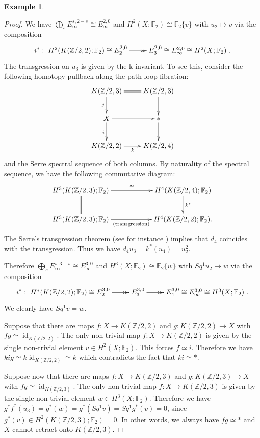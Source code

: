 \documentclass{amsart}
\theoremstyle{definition}
\newtheorem{exmp}[thm]{Example}
\theoremstyle{remark}
\DeclareMathOperator{\id}{id}
\newcommand{\Z}{\mathbb{Z}}
\newcommand{\F}{\mathbb{F}}
\begin{document}
\begin{exmp}
\begin{proof}
We have $\bigoplus_{s}E_\infty^{s,2-s}\cong E_\infty^{2,0}$ and $H^2(X;\F_2)\cong\F_2\{v\}$ with $u_2\mapsto v$ via the composition
$$
i^*:\xymatrix{H^2(K(\Z/2,2);\F_2)\cong E^{2,0}_2\ar@{->>}[r] &E^{2,0}_3\cong E^{2,0}_\infty\cong H^2(X;\F_2)}.
$$ 
\newpage
The transgression on $u_3$ is given by the k-invariant. To see this, consider the following homotopy pullback along the path-loop fibration:
$$\xymatrix{
K(\Z/2,3)\ar[d]_j\ar@{=}[r] &K(\Z/2,3)\ar[d]\\
X\ar[d]_i\ar[r] &{*}\ar[d]\\
K(\Z/2,2)\ar[r]_-k &K(\Z/2,4)
}$$ and the Serre spectral sequence of both columns. By naturality of the spectral sequence, we have the following commutative diagram:
$$\xymatrix@C=2truecm{
H^3(K(\Z/2,3);\F_2)\ar@{=}[d]\ar[r]^-\cong &H^4(K(\Z/2,4);\F_2)\ar[d]^{k^*}\\
H^3(K(\Z/2,3);\F_2)\ar[r]_-{\text{(transgression)}} &H^4(K(\Z/2,2);\F_2).
}$$ The Serre's transgression theorem (see for instance \cite[Theorem 6.8, p. 189]{Mc00}) implies that $d_4$ coincides with the transgression. Thus we have $d_4u_3=k^*(u_4)=u_2^2$. 

Therefore $\bigoplus_{s}E_\infty^{s,3-s}\cong E_\infty^{3,0}$ and $H^3(X;\F_2)\cong\F_2\{w\}$ with $Sq^1u_2\mapsto w$ via the composition
$$
i^*:\xymatrix{H^*(K(\Z/2,2);\F_2)\cong E_2^{3,0}\ar@{->>}[r] &E_3^{3,0}\ar@{->>}[r] &E_4^{3,0}\cong E_\infty^{3,0}\cong H^3(X;\F_2)}.
$$ 
We clearly have $Sq^1v=w$.

Suppose that there are maps $f:X\to K(\Z/2,2)$ and $g:K(\Z/2,2)\to X$ with $fg\simeq \id_{K(\Z/2,2)}$. The only non-trivial map $f:X\to K(\Z/2,2)$ is given by the single non-trivial element $v\in H^2(X;\F_2)$. This forces $f\simeq i$. Therefore we have $kig\simeq k\id_{K(\Z/2,2)}\simeq k$ which contradicts the fact that $ki\simeq *$.

Suppose now that there are maps $f:X\to K(\Z/2,3)$ and $g:K(\Z/2,3)\to X$ with $fg\simeq \id_{K(\Z/2,3)}$. The only non-trivial map $f:X\to K(\Z/2,3)$ is given by the single non-trivial element $w\in H^3(X;\F_2)$. Therefore we have $g^*f^*(u_3)=g^*(w)=g^*(Sq^1v)=Sq^1g^*(v)=0$, since $g^*(v)\in H^2(K(\Z/2,3);\F_2)=0$. In other words, we always have $fg\simeq*$ and $X$ cannot retract onto $K(\Z/2,3)$.

%
%


\end{proof}
\end{exmp}
\end{document}
